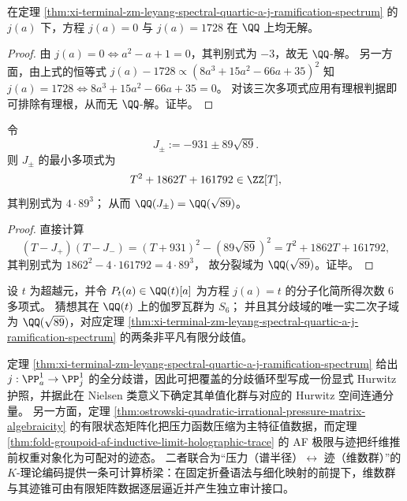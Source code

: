 \begin{corollary}[\texorpdfstring{$j=0$}{j=0} 与 \texorpdfstring{$j=1728$}{j=1728} 的有理参数阻断]\label{cor:xi-terminal-zm-leyang-spectral-quartic-a-j-0-1728-noQ}
在定理 \ref{thm:xi-terminal-zm-leyang-spectral-quartic-a-j-ramification-spectrum} 的 \(j(a)\) 下，方程 \(j(a)=0\) 与 \(j(a)=1728\) 在 \(\QQ\) 上均无解。
\end{corollary}
\begin{proof}
由 \(j(a)=0\iff a^2-a+1=0\)，其判别式为 \(-3\)，故无 \(\QQ\)-解。
另一方面，由上式的恒等式
\(
j(a)-1728\propto (8a^3+15a^2-66a+35)^2
\)
知 \(j(a)=1728\iff 8a^3+15a^2-66a+35=0\)。
对该三次多项式应用有理根判据即可排除有理根，从而无 \(\QQ\)-解。证毕。
\end{proof}

\begin{proposition}\label{prop:xi-terminal-zm-leyang-spectral-quartic-a-j-fib89-minpoly}
令
\[
J_\pm:=-931\pm 89\sqrt{89}.
\]
则 \(J_\pm\) 的最小多项式为
\[
T^2+1862T+161792\in\ZZ[T],
\]
其判别式为 \(4\cdot 89^3\)；
从而 \(\QQ(J_\pm)=\QQ(\sqrt{89})\)。
\end{proposition}
\begin{proof}
直接计算
\[
(T-J_+)(T-J_-)
=(T+931)^2-(89\sqrt{89})^2
=T^2+1862T+161792,
\]
其判别式为
\(
1862^2-4\cdot 161792=4\cdot 89^3
\)，
故分裂域为 \(\QQ(\sqrt{89})\)。证毕。
\end{proof}

\begin{conjecture}\label{conj:xi-terminal-zm-leyang-spectral-quartic-a-j-generic-s6}
设 \(t\) 为超越元，并令 \(P_t(a)\in\QQ(t)[a]\) 为方程 \(j(a)=t\) 的分子化简所得次数 \(6\) 多项式。
猜想其在 \(\QQ(t)\) 上的伽罗瓦群为 \(S_6\)；
并且其分歧域的唯一实二次子域为 \(\QQ(\sqrt{89})\)，对应定理 \ref{thm:xi-terminal-zm-leyang-spectral-quartic-a-j-ramification-spectrum} 的两条非平凡有限分歧值。
\end{conjecture}

\begin{remark}\label{rem:xi-terminal-zm-leyang-spectral-quartic-a-j-outlook}
定理 \ref{thm:xi-terminal-zm-leyang-spectral-quartic-a-j-ramification-spectrum} 给出 \(j:\PP^1_a\to\PP^1_j\) 的全分歧谱，因此可把覆盖的分歧循环型写成一份显式 Hurwitz 护照，并据此在 Nielsen 类意义下确定其单值化群与对应的 Hurwitz 空间连通分量。
另一方面，定理 \ref{thm:ostrowski-quadratic-irrational-pressure-matrix-algebraicity} 的有限状态矩阵化把压力函数压缩为主特征值数据，而定理 \ref{thm:fold-groupoid-af-inductive-limit-holographic-trace} 的 AF 极限与迹把纤维推前权重对象化为可配对的迹态。
二者联合为“压力（谱半径）\(\leftrightarrow\) 迹（维数群）”的 \(K\)-理论编码提供一条可计算桥梁：在固定折叠语法与细化映射的前提下，维数群与其迹锥可由有限矩阵数据逐层逼近并产生独立审计接口。
\end{remark}


